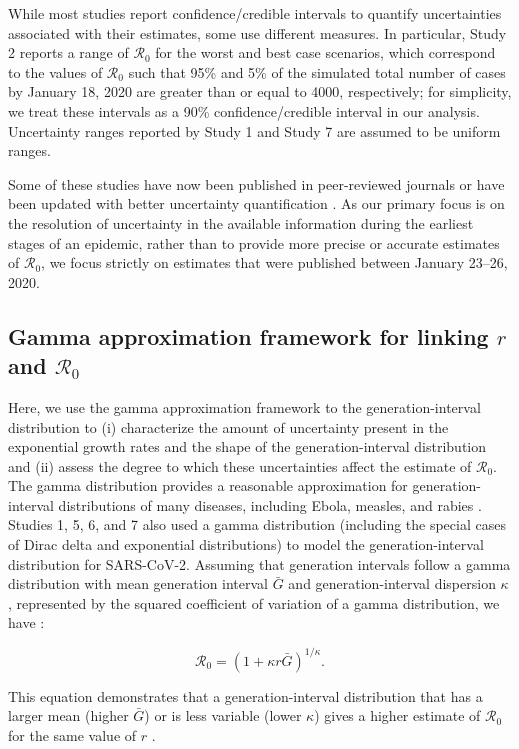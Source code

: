 \documentclass[12pt]{article}
\newcommand{\Ro}{\ensuremath{{\mathcal R}_{0}}\xspace}
\begin{document}
While most studies report confidence/credible intervals to quantify uncertainties associated with their estimates, some use different measures.
In particular, Study 2 reports a range of \Ro for the worst and best case scenarios, which correspond to the values of \Ro such that 95\% and 5\% of the simulated total number of cases by January 18, 2020 are greater than or equal to 4000, respectively;
for simplicity, we treat these intervals as a 90\% confidence/credible interval in our analysis.
Uncertainty ranges reported by Study 1 and Study 7 are assumed to be uniform ranges.

Some of these studies have now been published in peer-reviewed journals \citep{riou2020pattern, zhao2020preliminary} or have been updated with better uncertainty quantification \citep{readncov2}.
As our primary focus is on the resolution of uncertainty in the available information during the earliest stages of an epidemic, rather than to provide more precise or accurate estimates of \Ro, we focus strictly on estimates that were published between January 23--26, 2020.

\subsection{Gamma approximation framework for linking $r$ and $\Ro$}

Here, we use the gamma approximation framework to the generation-interval distribution \citep{nishiura2009transmission, mcbryde2009early, roberts2011early, trichereau2012estimation, nishiura2015theoretical, park2019practical} to (i) characterize the amount of uncertainty present in the exponential growth rates and the shape of the generation-interval distribution and (ii) assess the degree to which these uncertainties affect the estimate of \Ro.
The gamma distribution provides a reasonable approximation for generation-interval distributions of many diseases, including Ebola, measles, and rabies \citep{park2019practical}.
Studies 1, 5, 6, and 7 also used a gamma distribution (including the special cases of Dirac delta and exponential distributions) to model the generation-interval distribution for SARS-CoV-2.
Assuming that generation intervals follow a gamma distribution with mean generation interval $\bar G$ and generation-interval dispersion $\kappa$, represented by the squared coefficient of variation of a gamma distribution, we have \citep{park2019practical}:
\begin{linenomath*}
\begin{equation}
\Ro = \left(1 + \kappa r \bar{G}\right)^{1/\kappa}.
\label{eq:gamma}
\end{equation}
\end{linenomath*}
This equation demonstrates that a generation-interval distribution that has a larger mean (higher $\bar{G}$) or is less variable (lower $\kappa$) gives a higher estimate of \Ro for the same value of $r$ \citep{wallinga2007generation}.
\end{document}
